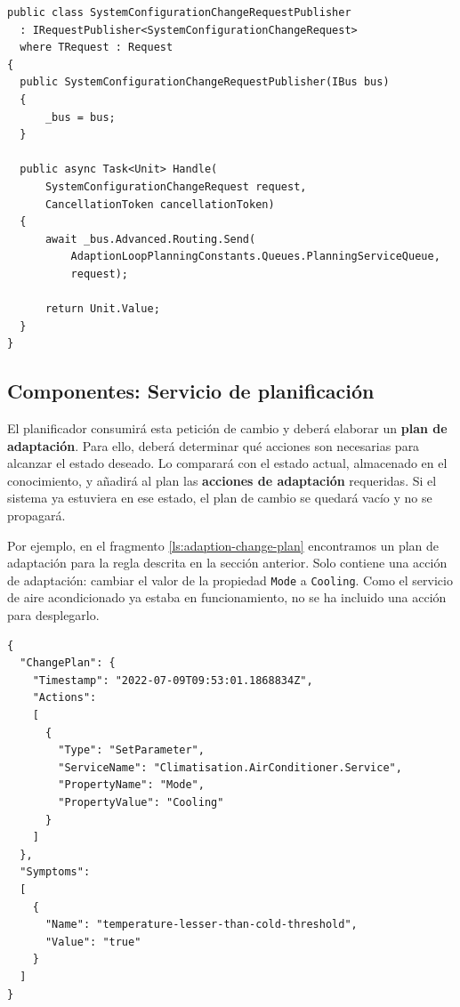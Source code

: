\begin{lstlisting}[caption={Las peticiones asíncronas se publican a una cola determinada.\protect\footnotemark},captionpos=b, label=ls:request-publisher]
public class SystemConfigurationChangeRequestPublisher
  : IRequestPublisher<SystemConfigurationChangeRequest>
  where TRequest : Request
{
  public SystemConfigurationChangeRequestPublisher(IBus bus)
  {
      _bus = bus;
  }

  public async Task<Unit> Handle(
      SystemConfigurationChangeRequest request,
      CancellationToken cancellationToken)
  {
      await _bus.Advanced.Routing.Send(
          AdaptionLoopPlanningConstants.Queues.PlanningServiceQueue,
          request);

      return Unit.Value;
  }
}
\end{lstlisting}



\subsection{Componentes: Servicio de planificación}

El planificador consumirá esta petición de cambio y deberá elaborar un \textbf{plan de adaptación}. Para ello, deberá determinar qué acciones son necesarias para alcanzar el estado deseado. Lo comparará con el estado actual, almacenado en el conocimiento, y añadirá al plan las \textbf{acciones de adaptación} requeridas. Si el sistema ya estuviera en ese estado, el plan de cambio se quedará vacío y no se propagará.

Por ejemplo, en el fragmento \ref{ls:adaption-change-plan} encontramos un plan de adaptación para la regla descrita en la sección anterior. Solo contiene una acción de adaptación: cambiar el valor de la propiedad \texttt{Mode} a \texttt{Cooling}. Como el servicio de aire acondicionado ya estaba en funcionamiento, no se ha incluido una acción para desplegarlo.

\begin{lstlisting}[style=json,caption={Plan de adaptación generado para la regla anterior. Solo contiene una acción de adaptación: cambiar la configuración \texttt{Mode} del servicio \texttt{AirConditioner}.},captionpos=b, label=ls:adaption-change-plan]
{
  "ChangePlan": {
    "Timestamp": "2022-07-09T09:53:01.1868834Z",
    "Actions":
    [
      {
        "Type": "SetParameter",
        "ServiceName": "Climatisation.AirConditioner.Service",
        "PropertyName": "Mode",
        "PropertyValue": "Cooling"
      }
    ]
  },
  "Symptoms":
  [
    {
      "Name": "temperature-lesser-than-cold-threshold",
      "Value": "true"
    }
  ]
}
\end{lstlisting}

